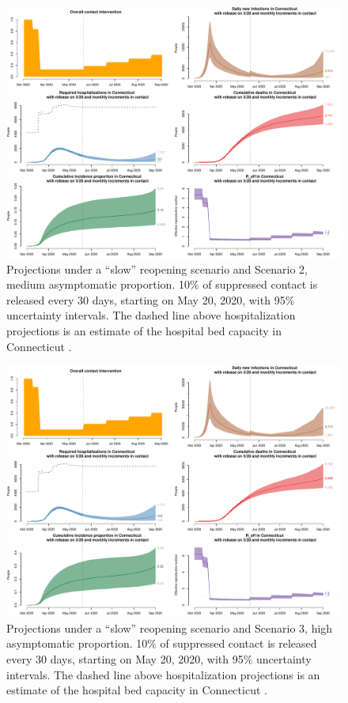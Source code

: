 \documentclass[11pt]{article}
\begin{document}
\begin{figure}[htb]
	\centering
	\includegraphics[width=.9\textwidth]{figures/slow_medium_full.pdf}
	\caption{Projections under a ``slow'' reopening scenario and Scenario 2, medium asymptomatic proportion. 10\% of suppressed contact is released every 30 days, starting on May 20, 2020, with 95\% uncertainty intervals. The dashed line above hospitalization projections is an estimate of the hospital bed capacity in Connecticut \citep{CHAwebsite}. }
	\label{fig:slow_medium}
\end{figure}

\begin{figure}[htb]
	\centering
	\includegraphics[width=.9\textwidth]{figures/slow_high_full.pdf}
	\caption{Projections under a ``slow'' reopening scenario and Scenario 3, high asymptomatic proportion. 10\% of suppressed contact is released every 30 days, starting on May 20, 2020, with 95\% uncertainty intervals. The dashed line above hospitalization projections is an estimate of the hospital bed capacity in Connecticut \citep{CHAwebsite}. }
	\label{fig:slow_high}
\end{figure}
\end{document}
